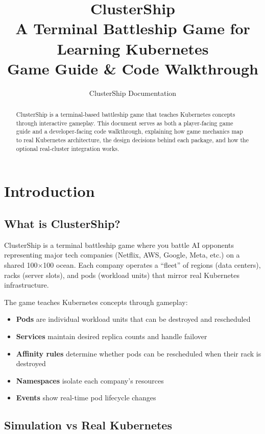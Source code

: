 \documentclass[11pt]{article}
\title{\textbf{ClusterShip} \\ \large A Terminal Battleship Game for Learning Kubernetes \\ \vspace{0.5cm} \normalsize Game Guide \& Code Walkthrough}
\author{ClusterShip Documentation}
\date{}
\begin{document}
\maketitle

\begin{abstract}
ClusterShip is a terminal-based battleship game that teaches Kubernetes concepts through interactive gameplay. This document serves as both a player-facing game guide and a developer-facing code walkthrough, explaining how game mechanics map to real Kubernetes architecture, the design decisions behind each package, and how the optional real-cluster integration works.
\end{abstract}

\tableofcontents
\newpage

\section{Introduction}

\subsection{What is ClusterShip?}

ClusterShip is a terminal battleship game where you battle AI opponents representing major tech companies (Netflix, AWS, Google, Meta, etc.) on a shared 100$\times$100 ocean. Each company operates a ``fleet'' of regions (data centers), racks (server slots), and pods (workload units) that mirror real Kubernetes infrastructure.

The game teaches Kubernetes concepts through gameplay:
\begin{itemize}
    \item \textbf{Pods} are individual workload units that can be destroyed and rescheduled
    \item \textbf{Services} maintain desired replica counts and handle failover
    \item \textbf{Affinity rules} determine whether pods can be rescheduled when their rack is destroyed
    \item \textbf{Namespaces} isolate each company's resources
    \item \textbf{Events} show real-time pod lifecycle changes
\end{itemize}

\subsection{Simulation vs Real Kubernetes}
\end{document}
